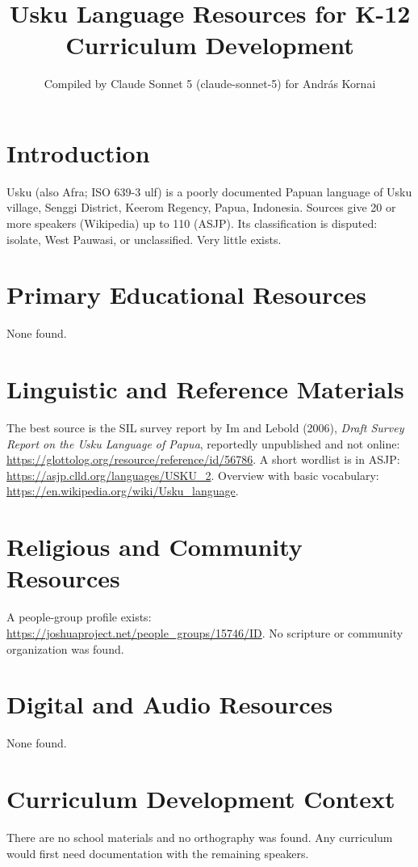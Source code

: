 \documentclass[12pt]{article}
\title{Usku Language Resources for K-12 Curriculum Development}
\author{Compiled by Claude Sonnet 5 (claude-sonnet-5) for Andr\'as Kornai}
\date{}
\begin{document}
\maketitle
\section{Introduction}
Usku (also Afra; ISO 639-3 ulf) is a poorly documented Papuan language of Usku village, Senggi District, Keerom Regency, Papua, Indonesia. Sources give 20 or more speakers (Wikipedia) up to 110 (ASJP). Its classification is disputed: isolate, West Pauwasi, or unclassified. Very little exists.
\section{Primary Educational Resources}
None found.
\section{Linguistic and Reference Materials}
The best source is the SIL survey report by Im and Lebold (2006), \emph{Draft Survey Report on the Usku Language of Papua}, reportedly unpublished and not online: \url{https://glottolog.org/resource/reference/id/56786}. A short wordlist is in ASJP: \url{https://asjp.clld.org/languages/USKU_2}. Overview with basic vocabulary: \url{https://en.wikipedia.org/wiki/Usku_language}.
\section{Religious and Community Resources}
A people-group profile exists: \url{https://joshuaproject.net/people_groups/15746/ID}. No scripture or community organization was found.
\section{Digital and Audio Resources}
None found.
\section{Curriculum Development Context}
There are no school materials and no orthography was found. Any curriculum would first need documentation with the remaining speakers.
\end{document}
